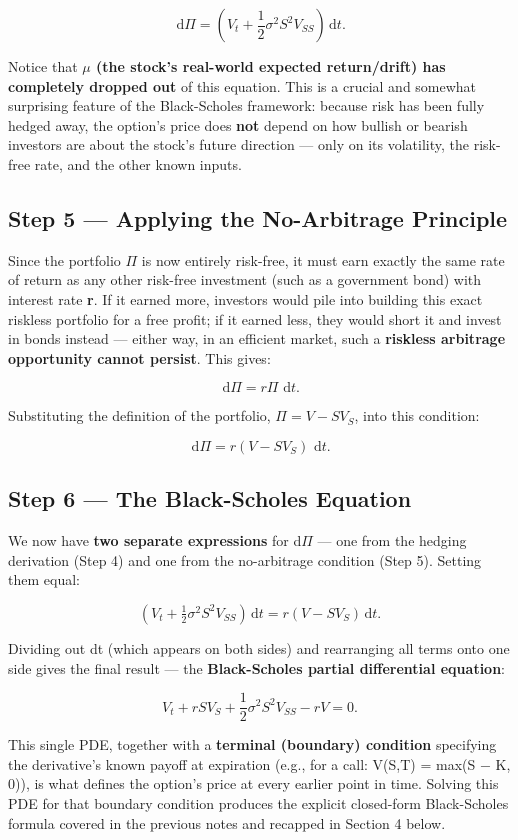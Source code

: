 \documentclass[12pt,openany]{book}
\theoremstyle{definition}
\theoremstyle{remark}
\newcommand{\dd}{\,\mathrm{d}}
\begin{document}
\[\dd\Pi=\left(V_t+\frac12\sigma^2S^2V_{SS}\right)\dd t.\]

Notice that \textbf{\(\mu\) (the stock's real-world expected return/drift) has completely dropped out} of this equation. This is a crucial and somewhat surprising feature of the Black-Scholes framework: because risk has been fully hedged away, the option's price does \textbf{not} depend on how bullish or bearish investors are about the stock's future direction --- only on its volatility, the risk-free rate, and the other known inputs.

\subsection{Step 5 --- Applying the No-Arbitrage Principle}

Since the portfolio \(\Pi\) is now entirely risk-free, it must earn exactly the same rate of return as any other risk-free investment (such as a government bond) with interest rate \textbf{r}. If it earned more, investors would pile into building this exact riskless portfolio for a free profit; if it earned less, they would short it and invest in bonds instead --- either way, in an efficient market, such a \textbf{riskless arbitrage opportunity cannot persist}. This gives:

\[\dd\Pi=r\Pi\,\dd t.\]

Substituting the definition of the portfolio, \(\Pi=V-SV_S\), into this condition:

\[\dd\Pi=r(V-SV_S)\,\dd t.\]

\subsection{Step 6 --- The Black-Scholes Equation}

We now have \textbf{two separate expressions} for d\(\Pi\) --- one from the hedging derivation (Step 4) and one from the no-arbitrage condition (Step 5). Setting them equal:

\[\left(V_t+\tfrac12\sigma^2S^2V_{SS}\right)\dd t=r(V-SV_S)\dd t.\]

Dividing out dt (which appears on both sides) and rearranging all terms onto one side gives the final result --- the \textbf{Black-Scholes partial differential equation}:

\[
\boxed{V_t+rSV_S+\frac12\sigma^2S^2V_{SS}-rV=0.}
\]

This single PDE, together with a \textbf{terminal (boundary) condition} specifying the derivative's known payoff at expiration (e.g., for a call: V(S,T) = max(S \(-\) K, 0)), is what defines the option's price at every earlier point in time. Solving this PDE for that boundary condition produces the explicit closed-form Black-Scholes formula covered in the previous notes and recapped in Section 4 below.
\end{document}
